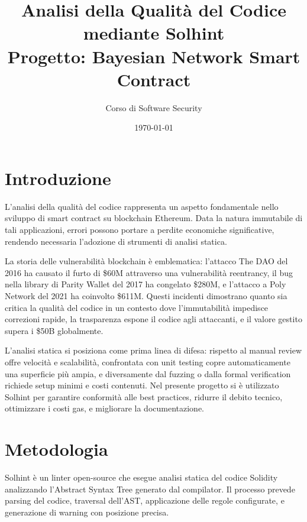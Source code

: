 \documentclass[12pt,a4paper]{article}
\title{\textbf{Analisi della Qualit\`a del Codice mediante Solhint}\\
\large{Progetto: Bayesian Network Smart Contract}}
\author{Corso di Software Security}
\date{\today}
\begin{document}
\maketitle
\thispagestyle{empty}
\newpage
\tableofcontents
\newpage

\section{Introduzione}

L'analisi della qualità del codice rappresenta un aspetto fondamentale nello sviluppo di smart contract su blockchain Ethereum. Data la natura immutabile di tali applicazioni, errori possono portare a perdite economiche significative, rendendo necessaria l'adozione di strumenti di analisi statica.

La storia delle vulnerabilità blockchain è emblematica: l'attacco The DAO del 2016 ha causato il furto di \$60M attraverso una vulnerabilità reentrancy, il bug nella library di Parity Wallet del 2017 ha congelato \$280M, e l'attacco a Poly Network del 2021 ha coinvolto \$611M. Questi incidenti dimostrano quanto sia critica la qualità del codice in un contesto dove l'immutabilità impedisce correzioni rapide, la trasparenza espone il codice agli attaccanti, e il valore gestito supera i \$50B globalmente.

L'analisi statica si posiziona come prima linea di difesa: rispetto al manual review offre velocità e scalabilità, confrontata con unit testing copre automaticamente una superficie più ampia, e diversamente dal fuzzing o dalla formal verification richiede setup minimi e costi contenuti. Nel presente progetto si è utilizzato Solhint per garantire conformità alle best practices, ridurre il debito tecnico, ottimizzare i costi gas, e migliorare la documentazione.

\section{Metodologia}

Solhint è un linter open-source che esegue analisi statica del codice Solidity analizzando l'Abstract Syntax Tree generato dal compilator. Il processo prevede parsing del codice, traversal dell'AST, applicazione delle regole configurate, e generazione di warning con posizione precisa.
\end{document}
